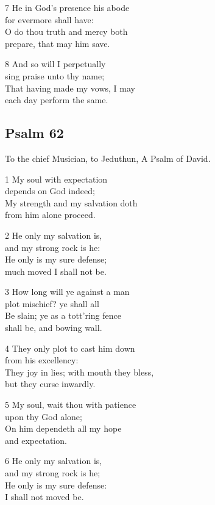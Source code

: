 7 He in God’s presence his abode\\
for evermore shall have:\\
O do thou truth and mercy both\\
prepare, that may him save.

8 And so will I perpetually\\
sing praise unto thy name;\\
That having made my vows, I may\\
each day perform the same.

\begin{center}
\quad{}\quad{}
\end{center}

\subsection*{Psalm 62}

To the chief Musician, to Jeduthun, A Psalm of David.

1 My soul with expectation\\
depends on God indeed;\\
My strength and my salvation doth\\
from him alone proceed.

2 He only my salvation is,\\
and my strong rock is he:\\
He only is my sure defense;\\
much moved I shall not be.

3 How long will ye against a man\\
plot mischief? ye shall all\\
Be slain; ye as a tott’ring fence\\
shall be, and bowing wall.

4 They only plot to cast him down\\
from his excellency:\\
They joy in lies; with mouth they bless,\\
but they curse inwardly.

5 My soul, wait thou with patience\\
upon thy God alone;\\
On him dependeth all my hope\\
and expectation.

6 He only my salvation is,\\
and my strong rock is he;\\
He only is my sure defense:\\
I shall not moved be.

